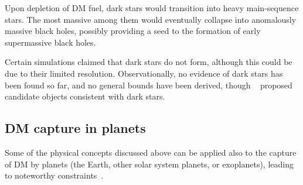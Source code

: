 Upon depletion of DM fuel, dark stars would 
transition into heavy main-sequence stars. The most massive among them would eventually collapse into anomalously massive black holes,
possibly providing a seed to the formation of early supermassive black holes.


\smallskip

Certain simulations \cite{DarkStars} claimed that dark stars do not form, although this could be due to their limited resolution.
Observationally, no evidence of dark stars has been found so far, and no general bounds have been derived, though
~\cite{DarkStars} proposed candidate objects consistent with dark stars.


\subsection{DM capture in planets}\label{sec:DMcaptureplanets}
Some of the physical concepts discussed above can be applied also  to the capture of DM by planets (the Earth, other solar system planets, or exoplanets), leading to noteworthy constraints~\cite{DMandplanets}.

\medskip

